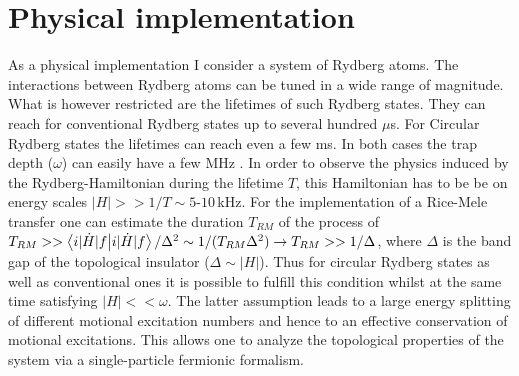 \section*{Physical implementation}\label{sec:Physical Implementation}
As a physical implementation I consider a system of Rydberg atoms. The interactions between Rydberg atoms can be tuned in a wide range of magnitude. What is however restricted are the lifetimes of such Rydberg states. They can reach for conventional Rydberg states up to several hundred $\mu$s. For Circular Rydberg states the lifetimes can reach even a few ms. In both cases the trap depth ($\omega$) can easily have a few MHz \cite{wilsonTrappingAlkalineEarth2022,holzlLongLivedCircularRydberg2024}. In order to observe the physics induced by the Rydberg-Hamiltonian during the lifetime $T$, this Hamiltonian has to be be on energy scales $|H|>>1/T\sim5$-$10\,$kHz. For the implementation of a Rice-Mele transfer one can estimate the duration $T_{RM}$ of the process of $T_{RM}>>\braket{i|\dot{H}|f}/\Delta^2\sim1/(T_{RM}\Delta^2)\rightarrow T_{RM}>>1/\Delta$, where $\Delta$ is the band gap of the topological insulator ($\Delta\sim|H|$). Thus for circular Rydberg states as well as conventional ones it is possible to fulfill this condition whilst at the same time satisfying $|H|<<\omega$. The latter assumption leads to a large energy splitting of different motional excitation numbers and hence to an effective conservation of motional excitations. This allows one to analyze the topological properties of the system via a single-particle fermionic formalism.


